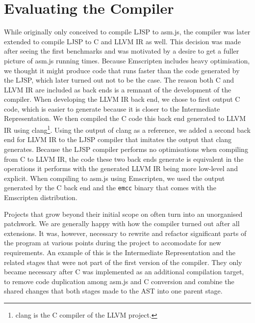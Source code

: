 \documentclass[11pt]{report}
\begin{document}
\section{Evaluating the Compiler}


While originally only conceived to compile LJSP to asm.js, the compiler was later extended to compile LJSP to C and LLVM IR as well. This decision was made after seeing the first benchmarks and was motivated by a desire to get a fuller picture of asm.js running times. Because Emscripten includes heavy optimisation, we thought it might produce code that runs faster than the code generated by the LJSP, which later turned out not to be the case. The reason both C and LLVM IR are included as back ends is a remnant of the development of the compiler. When developing the LLVM IR back end, we chose to first output C code, which is easier to generate because it is closer to the Intermediate Representation. We then compiled the C code this back end generated to LLVM IR using clang\footnote{clang is the C compiler of the LLVM project.}. Using the output of clang as a reference, we added a second back end for LLVM IR to the LJSP compiler that imitates the output that clang generates. Because the LJSP compiler performs no optimisations when compiling from C to LLVM IR, the code these two back ends generate is equivalent in the operations it performs with the generated LLVM IR being more low-level and explicit. When compiling to asm.js using Emscripten, we used the output generated by the C back end and the \texttt{emcc} binary that comes with the Emscripten distribution.

Projects that grow beyond their initial scope on often turn into an unorganised patchwork. We are generally happy with how the compiler turned out after all extensions. It was, however, necessary to rewrite and refactor significant parts of the program at various points during the project to accomodate for new requirements. An example of this is the Intermediate Representation and the related stages that were not part of the first version of the compiler. They only became necessary after C was implemented as an additional compilation target, to remove code duplication among asm.js and C conversion and combine the shared changes that both stages made to the AST into one parent stage.
\end{document}
